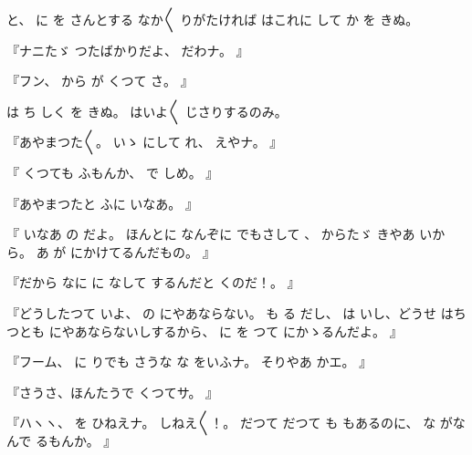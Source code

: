 と、
に
を
さんとする
なか〳〵
りがたければ
はこれに
して
か
を
きぬ。

『ナニたゞ
つたばかりだよ、
だわナ。
』

『フン、
から
が
くつて
さ。
』

は
ち
しく
を
きぬ。
はいよ〳〵
じさりするのみ。

『あやまつた〳〵。
いゝ
にして
れ、
えやナ。
』

『
くつても
ふもんか、
で
しめ。
』

『あやまつたと
ふに
いなあ。
』

『
いなあ
の
だよ。
ほんとに
なんぞに
でもさして
、
からたゞ
きやあ
いから。
あ
が
にかけてるんだもの。
』

『だから
なに
に
なして
するんだと
くのだ！。
』

『どうしたつて
いよ、
の
にやあならない。
も
る
だし、
は
いし、どうせ
はちつとも
にやあならないしするから、
に
を
つて
にかゝるんだよ。
』

『フーム、
に
りでも
さうな
な
をいふナ。
そりやあ
かエ。
』

『さうさ、ほんたうで
くつてサ。
』

『ハヽヽ、
を
ひねえナ。
しねえ〳〵！。
だつて
だつて
も
もあるのに、
な
がなんで
るもんか。
』

